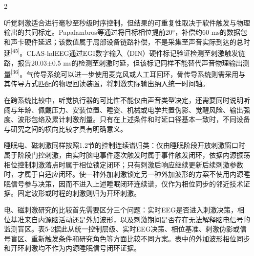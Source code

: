\documentclass[UTF8,zihao=5,fontset=none]{ctexart}
\newcommand{\hei}{\CJKfamily{hei}}
\newcommand{\leveltwo}[1]{%
  \par\noindent{\hei\fontsize{10.5pt}{15.6pt}\selectfont\bfseries #1\par}}
\newcommand{\refcite}[1]{\nolinebreak[4]\textsuperscript{[#1]}}
\begin{document}
\begin{multicols}{2}

听觉刺激适合进行毫秒至秒级时序控制，但结果的可重复性取决于软件触发与物理输出的共同标定。Papalambros等通过将目标相位提前20°，补偿约60 ms的数据包和声卡硬件延迟；该数值属于局部设备链路补偿，不是采集至声音实际到达的总时延\refcite{45}。CLAS-hdEEG通过EGI数字输入（DIN）硬件标记验证检测至刺激触发链路，报告20.03$\pm$0.5 ms的检测至刺激时延，但该标记同样不能替代声音物理输出测量\refcite{36}。气传导系统可以进一步使用麦克风或人工耳回环，骨传导系统则需采用与其传导方式匹配的物理回读装置，将刺激实际输出纳入统一时间轴。\par

在跨系统比较中，听觉执行器的可比性不能仅由声音类型决定，还需要同时说明听阈与年龄、佩戴压力、安装位置、睡姿、机械或电学共置伪影、觉醒风险、输出强度、波形包络及累计刺激剂量。只有在上述条件和时延口径基本一致时，不同设备与研究之间的横向比较才具有明确意义。\par

\leveltwo{5.2 电刺激与磁刺激}

睡眠电、磁刺激同样按照1.2节的控制连续谱归类：仅由睡眠阶段开放刺激窗口时属于阶段门控刺激，由实时脑电事件逐次触发时属于事件触发闭环，依据内源振荡相位控制刺激落点时属于相位锁定闭环；只有刺激后响应继续更新后续刺激参数时，才属于自适应闭环。使一种外加刺激锁定另一种外加波形的方案不使用内源睡眠信号参与决策，因而不进入上述睡眠闭环连续谱，仅作为相位同步的邻近技术证据。固定波形或时程的刺激则归为开环刺激。\par

电、磁刺激研究的比较首先需要区分三个问题：实时EEG是否进入刺激决策，相位基准来自内源脑活动还是外加波形，以及刺激期间是否存在无法解释脑电信号的监测盲区。表5-2据此从统一控制层级、实时EEG决策、相位基准、刺激伪影或信号盲区、重新触发条件和研究角色等方面比较不同方案。表中的外加波形相位同步和开环刺激均不作为内源睡眠信号闭环证据。\par

\end{multicols}
\end{document}
